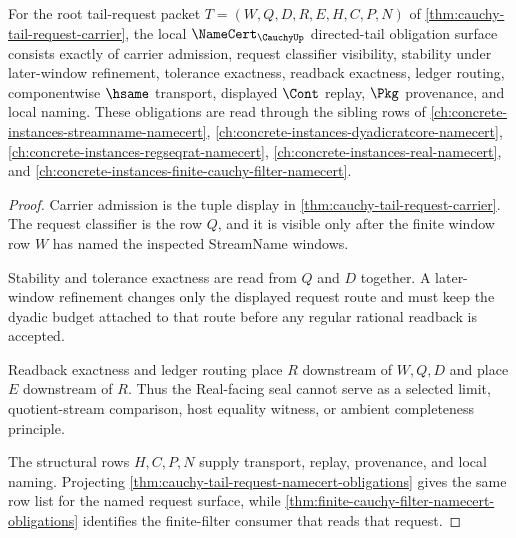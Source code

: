 \begin{theorem}
\label{thm:cauchy-directed-tail-namecert-obligations}
For the root tail-request packet $T=(W,Q,D,R,E,H,C,P,N)$ of \autoref{thm:cauchy-tail-request-carrier}, the local $\NameCert_{\CauchyUp}$ directed-tail obligation surface consists exactly of carrier admission, request classifier visibility, stability under later-window refinement, tolerance exactness, readback exactness, ledger routing, componentwise $\hsame$ transport, displayed $\Cont$ replay, $\Pkg$ provenance, and local naming. These obligations are read through the sibling rows of \autoref{ch:concrete-instances-streamname-namecert}, \autoref{ch:concrete-instances-dyadicratcore-namecert}, \autoref{ch:concrete-instances-regseqrat-namecert}, \autoref{ch:concrete-instances-real-namecert}, and \autoref{ch:concrete-instances-finite-cauchy-filter-namecert}.
\end{theorem}
\begin{proof}
Carrier admission is the tuple display in \autoref{thm:cauchy-tail-request-carrier}. The request classifier is the row $Q$, and it is visible only after the finite window row $W$ has named the inspected StreamName windows.

Stability and tolerance exactness are read from $Q$ and $D$ together. A later-window refinement changes only the displayed request route and must keep the dyadic budget attached to that route before any regular rational readback is accepted.

Readback exactness and ledger routing place $R$ downstream of $W,Q,D$ and place $E$ downstream of $R$. Thus the Real-facing seal cannot serve as a selected limit, quotient-stream comparison, host equality witness, or ambient completeness principle.

The structural rows $H,C,P,N$ supply transport, replay, provenance, and local naming. Projecting \autoref{thm:cauchy-tail-request-namecert-obligations} gives the same row list for the named request surface, while \autoref{thm:finite-cauchy-filter-namecert-obligations} identifies the finite-filter consumer that reads that request.
\end{proof}

